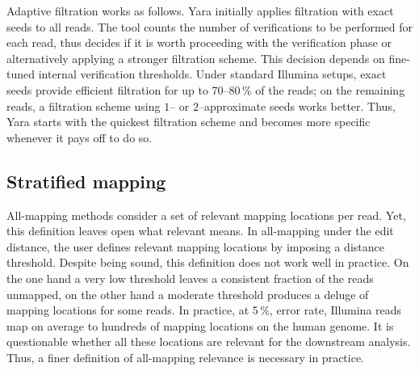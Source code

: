 Adaptive filtration works as follows.
Yara initially applies filtration with exact seeds to all reads.
The tool counts the number of verifications to be performed for each read, thus decides if it is worth proceeding with the verification phase or alternatively applying a stronger filtration scheme.
This decision depends on fine-tuned internal verification thresholds.
Under standard Illumina setups, exact seeds provide efficient filtration for up to 70--80\,\% of the reads; on the remaining reads, a filtration scheme using $1$-- or $2$--approximate seeds works better.
Thus, Yara starts with the quickest filtration scheme and becomes more specific whenever it pays off to do so.


\subsection{Stratified mapping}
\label{sec:yara:eng:strata}

All-mapping methods consider a set of relevant mapping locations per read.
Yet, this definition leaves open what relevant means.
In all-mapping under the edit distance, the user defines relevant mapping locations by imposing a distance threshold.
Despite being sound, this definition does not work well in practice.
On the one hand a very low threshold leaves a consistent fraction of the reads unmapped, on the other hand a moderate threshold produces a deluge of mapping locations for some reads.
In practice, at 5\,\%, error rate, Illumina reads map on average to hundreds of mapping locations on the human genome.
It is questionable whether all these locations are relevant for the downstream analysis.
Thus, a finer definition of all-mapping relevance is necessary in practice.


